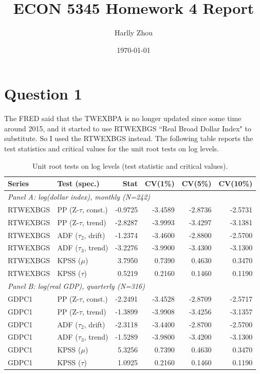 \documentclass[12pt]{article}
\title{ECON 5345 Homework 4 Report}
\author{Harlly Zhou}
\date{\today}
\begin{document}
\maketitle

\section*{Question 1}
    The FRED said that the TWEXBPA is no longer updated since some time around 2015, and it started to use RTWEXBGS ``Real Broad Dollar Index" to substitute. So I used the RTWEXBGS instead. The following table reports the test statistics and critical values for the unit root tests on log levels.

    \begin{table}[H]
    \centering
    \caption{Unit root tests on log levels (test statistic and critical values).}
    \begin{tabular}{l l r r r r}
    \hline
    Series & Test (spec.) & Stat & CV(1\%) & CV(5\%) & CV(10\%) \\
    \hline
    \multicolumn{6}{l}{\textit{Panel A: log(dollar index), monthly (N=242)}} \\
    RTWEXBGS & PP (Z-$\tau$, const.) & -0.9725 & -3.4589 & -2.8736 & -2.5731 \\
    RTWEXBGS & PP (Z-$\tau$, trend)  & -2.8287 & -3.9993 & -3.4297 & -3.1381 \\
    RTWEXBGS & ADF ($\tau_2$, drift) & -1.2374 & -3.4600 & -2.8800 & -2.5700 \\
    RTWEXBGS & ADF ($\tau_3$, trend) & -3.2276 & -3.9900 & -3.4300 & -3.1300 \\
    RTWEXBGS & KPSS ($\mu$)          &  3.7950 &  0.7390 &  0.4630 &  0.3470 \\
    RTWEXBGS & KPSS ($\tau$)         &  0.5219 &  0.2160 &  0.1460 &  0.1190 \\
    \hline
    \multicolumn{6}{l}{\textit{Panel B: log(real GDP), quarterly (N=316)}} \\
    GDPC1 & PP (Z-$\tau$, const.) & -2.2491 & -3.4528 & -2.8709 & -2.5717 \\
    GDPC1 & PP (Z-$\tau$, trend)  & -1.3899 & -3.9908 & -3.4256 & -3.1357 \\
    GDPC1 & ADF ($\tau_2$, drift) & -2.3118 & -3.4400 & -2.8700 & -2.5700 \\
    GDPC1 & ADF ($\tau_3$, trend) & -1.5289 & -3.9800 & -3.4200 & -3.1300 \\
    GDPC1 & KPSS ($\mu$)          &  5.3256 &  0.7390 &  0.4630 &  0.3470 \\
    GDPC1 & KPSS ($\tau$)         &  1.0925 &  0.2160 &  0.1460 &  0.1190 \\
    \hline
    \end{tabular}
    \end{table}
\end{document}
